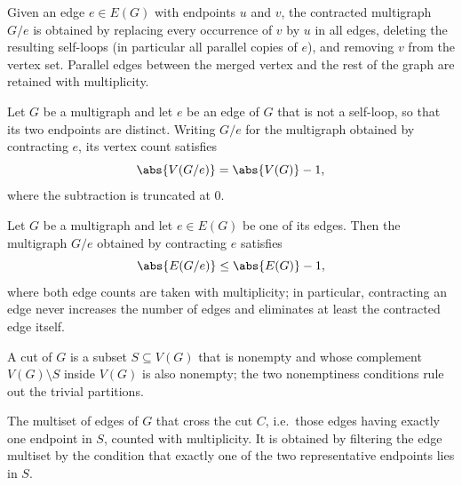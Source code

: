 \begin{definition}
\label{Multigraph.contract}
\leanok
{}
Given an edge $e \in E(G)$ with endpoints $u$ and $v$, the contracted multigraph
$G/e$ is obtained by replacing every occurrence of $v$ by $u$ in all edges, deleting
the resulting self-loops (in particular all parallel copies of $e$), and removing $v$
from the vertex set. Parallel edges between the merged vertex and the rest of the graph
are retained with multiplicity.
\end{definition}

\begin{lemma}
\label{contract_vertex_count}
\leanok
{}
Let $G$ be a multigraph and let $e$ be an edge of $G$ that is not a self-loop, so that
its two endpoints are distinct. Writing $G/e$ for the multigraph obtained by contracting
$e$, its vertex count satisfies
\[
  \abs{V(G/e)} = \abs{V(G)} - 1,
\]
where the subtraction is truncated at $0$.
\end{lemma}

\begin{lemma}
\label{contract_edge_count_le}
\leanok
{}
Let $G$ be a multigraph and let $e \in E(G)$ be one of its edges. Then the multigraph
$G/e$ obtained by contracting $e$ satisfies
\[
  \abs{E(G/e)} \le \abs{E(G)} - 1,
\]
where both edge counts are taken with multiplicity; in particular, contracting an edge
never increases the number of edges and eliminates at least the contracted edge itself.
\end{lemma}

\begin{definition}
\label{MulCut}
\leanok
{}
A cut of $G$ is a subset $S \subseteq V(G)$ that is nonempty and whose complement
$V(G) \setminus S$ inside $V(G)$ is also nonempty; the two nonemptiness conditions rule
out the trivial partitions.
\end{definition}

\begin{definition}
\label{MulCut.crossingEdges}
\leanok
{}
The multiset of edges of $G$ that cross the cut $C$, i.e.\ those edges having exactly
one endpoint in $S$, counted with multiplicity. It is obtained by filtering the edge
multiset by the condition that exactly one of the two representative endpoints lies
in $S$.
\end{definition}

